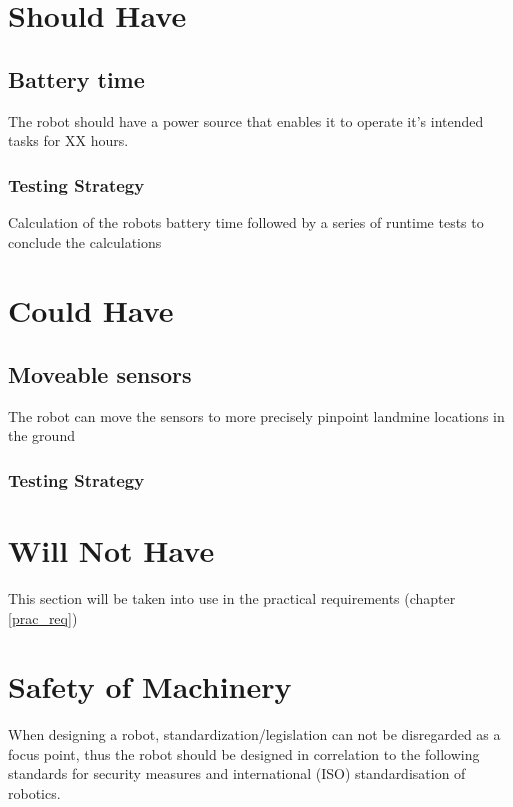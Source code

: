 
\section{Should Have}

\subsection{Battery time}\label{R12}
The robot should have a power source that enables it to operate it's intended tasks for XX hours.

\subsubsection*{Testing Strategy}
Calculation of the robots battery time followed by a series of runtime tests to conclude the calculations


\section{Could Have}

\subsection{Moveable sensors}\label{R13}
The robot can move the sensors to more precisely pinpoint landmine locations in the ground

\subsubsection*{Testing Strategy}

\section{Will Not Have}

This section will be taken into use in the practical requirements (chapter \ref{prac_req})


\newpage


\section{Safety of Machinery}
When designing a robot, standardization/legislation can not be disregarded as a focus point, thus the robot should be designed in correlation to the following standards for security measures and international (ISO) standardisation of robotics.

